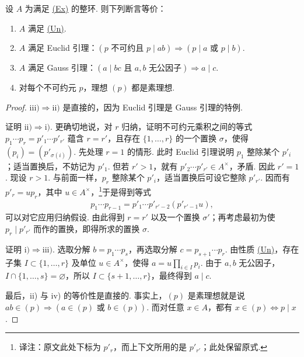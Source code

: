 \begin{lemma*}\hypertarget{galois-ufd-equivalences}{}
设 $A$ 为满足 \hyperlink{galois-factorization-ex}{(Ex)} 的整环. 则下列断言等价：
\begin{enumerate}[label=\roman*)]
\item $A$ 满足 \hyperlink{galois-factorization-un}{(Un)}.
\item $A$ 满足 Euclid 引理：$(p\text{ 不可约且 }p\mid ab)\Rightarrow(p\mid a\text{ 或 }p\mid b)$.
\item $A$ 满足 Gauss 引理：$(a\mid bc\text{ 且 }a,b\text{ 无公因子})\Rightarrow a\mid c$.
\item 对每个不可约元 $p$，理想 $(p)$ 都是素理想.
\end{enumerate}
\end{lemma*}
\begin{proof}
$\mathrm{iii)}\Rightarrow\mathrm{ii)}$ 是直接的，因为 Euclid 引理是 Gauss 引理的特例.

证明 $\mathrm{ii)}\Rightarrow\mathrm{i)}$. 更确切地说，对 $r$ 归纳，证明不可约元乘积之间的等式 $p_1\cdots p_r=p'_1\cdots p'_{r'}$ 蕴含 $r=r'$，且存在 $\{1,\ldots,r\}$ 的一个置换 $\sigma$，使得 $(p_i)=(p'_{\sigma(i)})$. 先处理 $r=1$ 的情形. 此时 Euclid 引理说明 $p_1$ 整除某个 $p'_i$；适当置换后，不妨记为 $p'_1$. 但若 $r'>1$，就有 $p'_2\cdots p'_{r'}\in A^\times$，矛盾. 因此 $r'=1$. 现设 $r>1$. 与前面一样，$p_r$ 整除某个 $p'_i$，适当置换后可设它整除 $p'_{r'}$. 因而有 $p'_r=up_r$，其中 $u\in A^\times$，\footnote{译注：原文此处下标为 $p'_r$，而上下文所用的是 $p'_{r'}$；此处保留原式.}于是得到等式
\begin{align*}
p_1\cdots p_{r-1}=p'_1\cdots p'_{r'-2}(p'_{r'-1}u),
\end{align*}
可以对它应用归纳假设. 由此得到 $r=r'$ 以及一个置换 $\sigma'$；再考虑最初为使 $p_r\mid p'_{r'}$ 而作的置换，即得所求的置换 $\sigma$.

证明 $\mathrm{i)}\Rightarrow\mathrm{iii)}$. 选取分解 $b=p_1\cdots p_s$，再选取分解 $c=p_{s+1}\cdots p_r$. 由性质 \hyperlink{galois-factorization-un}{(Un)}，存在子集 $I\subset\{1,\ldots,r\}$ 及单位 $u\in A^\times$，使得 $a=u\prod_{i\in I}p_i$. 由于 $a,b$ 无公因子，$I\cap\{1,\ldots,s\}=\varnothing$，所以 $I\subset\{s+1,\ldots,r\}$，最终得到 $a\mid c$.

最后，ii) 与 iv) 的等价性是直接的. 事实上，$(p)$ 是素理想就是说 $ab\in(p)\Rightarrow(a\in(p)\text{ 或 }b\in(p))$. 而对任意 $x\in A$，都有 $x\in(p)\Leftrightarrow p\mid x$.
\end{proof}


